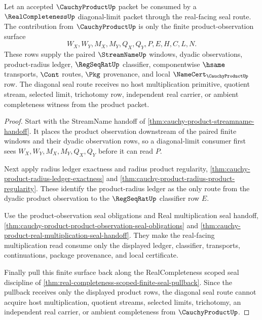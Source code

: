 \begin{theorem}
\label{thm:cauchy-product-real-completeness-diagonal-seal-route}
Let an accepted $\CauchyProductUp$ packet be consumed by a $\RealCompletenessUp$ diagonal-limit packet through the real-facing seal route. The contribution from $\CauchyProductUp$ is only the finite product-observation surface
$$
W_X,W_Y,M_X,M_Y,Q_X,Q_Y,P,E,H,C,L,N.
$$
These rows supply the paired $\StreamNameUp$ windows, dyadic observations, product-radius ledger, $\RegSeqRatUp$ classifier, componentwise $\hsame$ transports, $\Cont$ routes, $\Pkg$ provenance, and local $\NameCert_{\CauchyProductUp}$ row. The diagonal seal route receives no host multiplication primitive, quotient stream, selected limit, trichotomy row, independent real carrier, or ambient completeness witness from the product packet.
\end{theorem}
\begin{proof}
Start with the StreamName handoff of \autoref{thm:cauchy-product-streamname-handoff}. It places the product observation downstream of the paired finite windows and their dyadic observation rows, so a diagonal-limit consumer first sees $W_X,W_Y,M_X,M_Y,Q_X,Q_Y$ before it can read $P$.

Next apply radius ledger exactness and radius product regularity, \autoref{thm:cauchy-product-radius-ledger-exactness} and \autoref{thm:cauchy-product-radius-product-regularity}. These identify the product-radius ledger as the only route from the dyadic product observation to the $\RegSeqRatUp$ classifier row $E$.

Use the product-observation seal obligations and Real multiplication seal handoff, \autoref{thm:cauchy-product-product-observation-seal-obligations} and \autoref{thm:cauchy-product-real-multiplication-seal-handoff}. They make the real-facing multiplication read consume only the displayed ledger, classifier, transports, continuations, package provenance, and local certificate.

Finally pull this finite surface back along the RealCompleteness scoped seal discipline of \autoref{thm:real-completeness-scoped-finite-seal-pullback}. Since the pullback receives only the displayed product rows, the diagonal seal route cannot acquire host multiplication, quotient streams, selected limits, trichotomy, an independent real carrier, or ambient completeness from $\CauchyProductUp$.
\end{proof}

